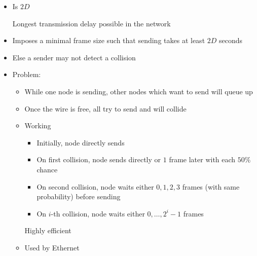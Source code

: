 \begin{itemize}
\begin{itemize}
                \begin{itemize}
                    \item Is $2D$
                        \begin{itemize}
                             Longest transmission delay possible in the network
                        \end{itemize}
                    \item Imposes a minimal frame size such that sending takes at least $2D$ seconds
                    \item Else a sender may not detect a collision
                \end{itemize}
            \end{itemize}
        \begin{itemize}
            \item Problem:
                \begin{itemize}
                    \item While one node is sending, other nodes which want to send will queue up
                    \item Once the wire is free, all try to send and will collide
                \end{itemize}
                \begin{itemize}
                     When $N$ nodes are queued, each will send with a probability of $\frac{1}{N}$
                    \item Working
                        \begin{itemize}
                            \item Initially, node directly sends
                            \item On first collision, node sends directly or $1$ frame later with each $50\%$ chance
                            \item On second collision, node waits either $0, 1, 2, 3$ frames (with same probability) before sending
                            \item On $i$-th collision, node waits either $0, \dots, 2^i-1$ frames
                        \end{itemize}
                    \ipro Highly efficient
                    \item Used by Ethernet
                \end{itemize}
        \end{itemize}

\end{itemize}
